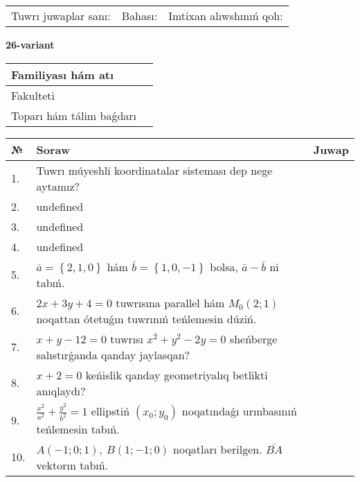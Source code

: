 \documentclass{article}
\begin{document}
\vspace{0.7cm}

\begin{tabular}{lll}
Tuwrı juwaplar sanı: \underline{\hspace{1cm}} & 
Bahası: \underline{\hspace{1cm}} & 
Imtixan alıwshınıń qolı: \underline{\hspace{2cm}} \\
\end{tabular}

\egroup

\newpage


\textbf{26-variant}\\

\bgroup
\def\arraystretch{1.6} %

\begin{tabular}{|m{5.7cm}|m{9.5cm}|}
\hline
Familiyası hám atı & \\
\hline
Fakulteti  & \\
\hline
Toparı hám tálim baǵdarı  & \\
\hline
\end{tabular}

\vspace{0.7cm}

\begin{tabular}{|m{0.7cm}|m{10cm}|m{4cm}|}
\hline
№ & Soraw & Juwap \\
\hline
1. & Tuwrı múyeshli koordinatalar sisteması dep nege aytamız? &  \\
\hline
2. & undefined &  \\
\hline
3. & undefined &  \\
\hline
4. & undefined &  \\
\hline
5. & \(\bar{a} = \left\{ 2, 1, 0 \right\}\) hám \(\bar{b} = \left\{ 1, 0,- 1 \right\}\) bolsa, \(\bar{a} - \bar{b}\) ni tabıń. &  \\
\hline
6. & \(2 x + 3 y + 4 = 0\) tuwrısına parallel hám \(M_{0} (2;1)\) noqattan ótetuǵın tuwrınıń teńlemesin dúziń. &  \\
\hline
7. & \(x + y - 12 = 0\) tuwrısı \(x^{2} + y^{2} - 2 y = 0\) sheńberge salıstırǵanda qanday jaylasqan? &  \\
\hline
8. & \(x + 2 = 0\) keńislik qanday geometriyalıq betlikti anıqlaydı? &  \\
\hline
9. & \(\frac{x^{2}}{a^{2}} + \frac{y^{2}}{b^{2}} = 1\) ellipstiń \((x_{0};y_{0})\) noqatındaǵı urınbasınıń teńlemesin tabıń. &  \\
\hline
10. & \(A (- 1;0;1),\ B (1; - 1;0)\) noqatları berilgen. \(\bar{BA}\) vektorın tabıń. & \\
\hline
\end{tabular}
\end{document}
